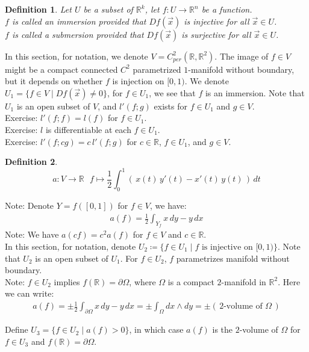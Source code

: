 \documentclass[11pt,oneside]{book}
\theoremstyle{break}
\theoremstyle{break}
\newtheorem{defn}{Definition}[corL]
\newcommand{\R}{\mathbb{R}}
\newcommand{\note}{\color{red}Note: \color{black}}
\newcommand{\exercise}{\color{green}Exercise: \color{black}}
\begin{document}
\begin{defn}
Let $U$ be a subset of $\R^k$, let $f:U \to \R^n$ be a function.\\ 
$f$ is called an immersion provided that $Df(\vec{x})$ is injective for all $\vec{x}\in U$. \\
$f$ is called a submersion provided that $Df(\vec{x})$ is surjective for all $\vec{x}\in U$.  
\end{defn}

In this section, for notation, we denote $V = C_{per}^2 (\R,\R^2)$. The image of $f \in V$ might be a compact connected $C^2$ parametrized $1$-manifold without boundary, but it depends on whether $f$ is injection on $[0,1)$. We denote $U_1 = \{ f\in V \mid Df(\vec{x}) \neq 0\}$, for $f \in U_1$, we see that $f$ is an immersion. Note that $U_1$ is an open subset of $V$, and $l'(f;g)$ exists for $f \in U_1$ and $g \in V$.\\

\exercise $l'(f;f) = l(f)$ for $f \in U_1$. \\
\exercise $l$ is differentiable at each $f \in U_1$. \\
\exercise $l'(f; cg) = c\, l'(f;g)$ for $c \in \R$, $f \in U_1$, and $g \in V$.\\

\begin{defn}
$$a:V \to \R \ \ \ f\mapsto \frac{1}{2}\int_0^1 (\,x(t)\,y'(t) - x'(t)\,y(t)\,)\, dt$$
\end{defn}
\note Denote $Y = f([0,1])$ for $f \in V$, we have:
\begin{align*}
a(f) = \frac{1}{2}\int_{Y_f} x\, dy - y\, dx 
\end{align*}
\note We have $a(cf) = c^2a(f)$ for $f \in V$ and $c \in \R$.\\

In this section, for notation, denote $U_2 \coloneqq \{ f \in U_1 \mid f\text{ is injective on }[0,1)\}$. Note that $U_2$ is an open subset of $U_1$. For $f\in U_2$, $f$ parametrizes manifold without boundary.\\

\note $f \in U_2$ implies $f(\R)  = \partial \Omega$, where $\Omega$ is a compact $2$-manifold in $\R^2$. Here we can write:
\begin{align*}
a(f) =\pm  \frac{1}{2}\int_{\partial \Omega} x\, dy - y\, dx = \pm \int_{\Omega} dx \wedge dy =\pm (\,2\text{-volume of }\Omega\,)
\end{align*} 

Define $U_3 = \{ f\in U_2 \mid a(f) >0 \}$, in which case $a(f)$ is the $2$-volume of $\Omega$ for $f \in U_3$ and $f(\R) = \partial \Omega$. \\
\end{document}
